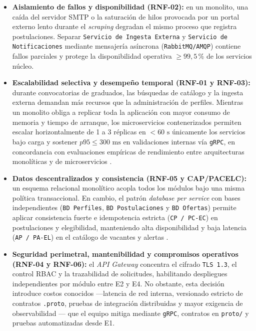 \documentclass[11pt,a4paper]{article}
\begin{document}
\begin{itemize}
    \item \textbf{Aislamiento de fallos y disponibilidad (RNF-02):} en un monolito, una caída del servidor SMTP o la saturación de hilos provocada por un portal externo lento durante el \textit{scraping} degradan el mismo proceso que registra postulaciones. Separar \texttt{Servicio de Ingesta Externa} y \texttt{Servicio de Notificaciones} mediante mensajería asíncrona (\texttt{RabbitMQ/AMQP}) contiene fallos parciales y protege la disponibilidad operativa $\ge 99{,}5$\,\% de los servicios núcleo.
    \item \textbf{Escalabilidad selectiva y desempeño temporal (RNF-01 y RNF-03):} durante convocatorias de graduados, las búsquedas de catálogo y la ingesta externa demandan más recursos que la administración de perfiles. Mientras un monolito obliga a replicar toda la aplicación con mayor consumo de memoria y tiempo de arranque, los microservicios contenerizados permiten escalar horizontalmente de 1 a 3 réplicas en $< 60\text{ s}$ únicamente los servicios bajo carga y sostener $p95 \le 300\text{ ms}$ en validaciones internas vía \texttt{gRPC}, en concordancia con evaluaciones empíricas de rendimiento entre arquitecturas monolíticas y de microservicios \cite{blinowski2022}.
    \item \textbf{Datos descentralizados y consistencia (RNF-05 y CAP/PACELC):} un esquema relacional monolítico acopla todos los módulos bajo una misma política transaccional. En cambio, el patrón \textit{database per service} con bases independientes (\texttt{BD Perfiles}, \texttt{BD Postulaciones} y \texttt{BD Ofertas}) permite aplicar consistencia fuerte e idempotencia estricta (\texttt{CP / PC-EC}) en postulaciones y elegibilidad, manteniendo alta disponibilidad y baja latencia (\texttt{AP / PA-EL}) en el catálogo de vacantes y alertas \cite{laigner2021}.
    \item \textbf{Seguridad perimetral, mantenibilidad y compromisos operativos (RNF-04 y RNF-06):} el \textit{API Gateway} concentra el cifrado \texttt{TLS 1.3}, el control RBAC y la trazabilidad de solicitudes, habilitando despliegues independientes por módulo entre E2 y E4. No obstante, esta decisión introduce costos conocidos —latencia de red interna, versionado estricto de contratos \texttt{.proto}, pruebas de integración distribuidas y mayor exigencia de observabilidad \cite{aksakalli2021,waseem2021}— que el equipo mitiga mediante \texttt{gRPC}, contratos en \texttt{proto/} y pruebas automatizadas desde E1.
\end{itemize}
\end{document}
